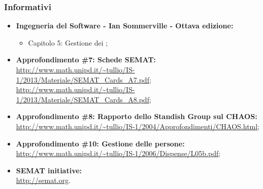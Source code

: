 \subsubsection{Informativi} \label{informativi}
\begin{itemize}
\item \textbf{Ingegneria del Software - Ian Sommerville - Ottava edizione:}
\begin{itemize}
\item Capitolo 5: Gestione dei ;
\end{itemize}
\item \textbf{Approfondimento \#7: Schede SEMAT:} \\
\url{http://www.math.unipd.it/~tullio/IS-1/2013/Materiale/SEMAT_Cards_A7.pdf}; \\
\url{http://www.math.unipd.it/~tullio/IS-1/2013/Materiale/SEMAT_Cards_A8.pdf};
\item \textbf{Approfondimento \#8: Rapporto dello Standish Group sul  CHAOS:} \\
\url{http://www.math.unipd.it/~tullio/IS-1/2004/Approfondimenti/CHAOS.html};
\item \textbf{Approfondimento \#10: Gestione delle persone:} \\
\url{http://www.math.unipd.it/~tullio/IS-1/2006/Dispense/L05b.pdf};
\item \textbf{SEMAT initiative:} \\
\url{http://semat.org}.
\end{itemize}
